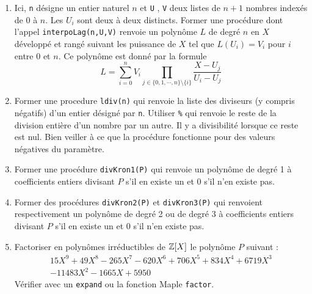 \begin{enumerate}
\item Ici, \verb|n| désigne un entier naturel $n$ et \verb|U| , \verb|V| deux listes de $n+1$ nombres indexés de $0$ à $n$. Les $U_i$ sont deux à deux distincts.\newline
Former une procédure dont l'appel \verb|interpoLag(n,U,V)| renvoie un polynôme $L$ de degré $n$ en $X$ développé et rangé suivant les puissance de $X$ tel que $L(U_i)=V_i$ pour $i$ entre $0$ et $n$. Ce polynôme est donné par la formule
\begin{displaymath}
 L=\sum_{i=0}^{n}V_i\prod_{j\in\{0,1,\cdots,n\}\setminus\{i\}}\frac{X-U_j}{U_i-U_j}
\end{displaymath}

 \item Former une procedure \verb|ldiv(n)| qui renvoie la liste des diviseurs (y compris négatifs) d'un entier désigné par \verb|n|. Utiliser \verb|%| qui renvoie le reste de la division entière d'un nombre par un autre. Il y a divisibilité lorsque ce reste est nul. Bien veiller à ce que la procédure fonctionne pour des valeurs négatives du paramètre.
\item Former une procédure \verb|divKron1(P)| qui renvoie un polynôme de degré 1 à coefficients entiers divisant $P$ s'il en existe un et $0$ s'il n'en existe pas. 
\item Former des procédures \verb|divKron2(P)| et \verb|divKron3(P)| qui renvoient respectivement un polynôme de degré 2 ou de degré $3$ à coefficients entiers divisant $P$ s'il en existe un et $0$ s'il n'en existe pas. 

\item Factoriser en polynômes irréductibles de $\mathbb{Z}[X]$ le polynôme $P$ suivant :
\begin{multline*}
 15X^9+49X^8-265X^7-620X^6+706X^5+834X^4+6719X^3\\-11483X^2-1665X+5950
\end{multline*}
Vérifier avec un \verb|expand| ou la fonction Maple \verb|factor|.
\end{enumerate}

